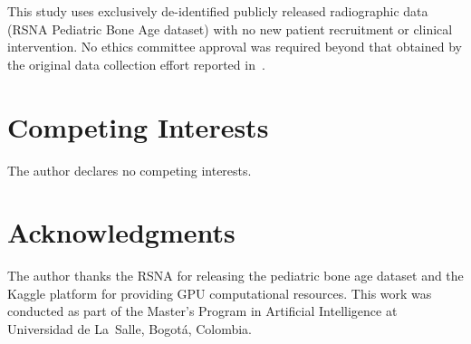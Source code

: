 \documentclass[journal]{IEEEtran}
\begin{document}
This study uses exclusively de-identified publicly released radiographic
data (RSNA Pediatric Bone Age dataset) with no new patient recruitment
or clinical intervention.
No ethics committee approval was required beyond that obtained by the
original data collection effort reported in~\cite{halabi2019}.

\section*{Competing Interests}

The author declares no competing interests.

\section*{Acknowledgments}

The author thanks the RSNA for releasing the pediatric bone age dataset
and the Kaggle platform for providing GPU computational resources.
This work was conducted as part of the Master's Program in Artificial
Intelligence at Universidad de La~Salle, Bogot\'{a}, Colombia.



\end{document}
